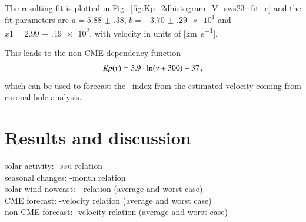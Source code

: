 The resulting fit is plotted in Fig.~\ref{fig:Kp_2dhistogram_V_sws23_fit_e} and the fit parameters are $a = \num{5.88(38)}$, $b = \num{-3.70(29)e1}$ and $x1 = \num{2.99(49)e2}$, with velocity in units of [\si{\km\per\s}].\\
\begin{figure}
\end{figure}
This leads to the non-CME dependency function
\begin{align}
	\textit{Kp}(v) = 5.9 \cdot \ln(v + 300) - 37	\,,	\label{eq:kpvsv_sws23_dependency_function}
\end{align}
which can be used to forecast the \Kp{}~index from the estimated velocity coming from coronal hole analysis.\\


\section{Results and discussion}
solar activity: \Kp-$ssn$ relation\\
seasonal changes: \Kp{}-month relation\\
solar wind nowcast: \Kp-\vBz{} relation (average and worst case)\\
CME forecast: \Kp-velocity relation (average and worst case)\\
non-CME forecast: \Kp-velocity relation (average and worst case)\\

